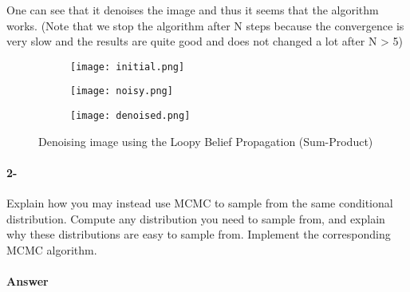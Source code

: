 \documentclass{article}
\begin{document}
One can see that it denoises the image and thus it seems that the algorithm works. (Note that we stop the algorithm after N steps
because the convergence is very slow and the results are quite good and does not changed a lot after N > 5)

\begin{figure}[h!]
    \centering
    \begin{subfigure}[b]{0.3\linewidth}
        \texttt{[image: initial.png]}
    \end{subfigure}
    \begin{subfigure}[b]{0.3\linewidth}
        \texttt{[image: noisy.png]}
    \end{subfigure}
    \begin{subfigure}[b]{0.3\linewidth}
        \texttt{[image: denoised.png]}
    \end{subfigure}
    \caption{Denoising image using the Loopy Belief Propagation (Sum-Product)}
    \label{fig:LBP}
\end{figure}

\paragraph*{2-} Explain how you may instead use MCMC to sample from the same conditional distribution. Compute
any distribution you need to sample from, and explain why these distributions are easy to sample from.
Implement the corresponding MCMC algorithm.

\paragraph*{Answer}
\end{document}
